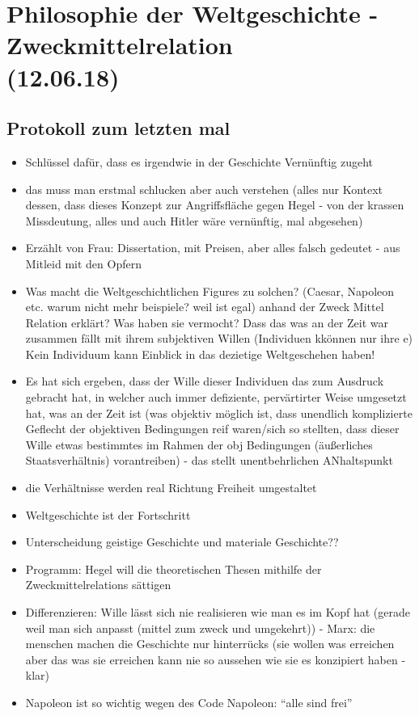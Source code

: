 \documentclass[emulatestandardclasses]{scrartcl}
\begin{document}
\section{Philosophie der Weltgeschichte - Zweckmittelrelation\\(12.06.18)}

\subsection{Protokoll zum letzten mal}

\begin{itemize}
  \item Schlüssel dafür, dass es irgendwie in der Geschichte Vernünftig zugeht
  \item das muss man erstmal schlucken aber auch verstehen (alles nur Kontext dessen, dass dieses Konzept zur Angriffsfläche gegen Hegel - von der krassen Missdeutung, alles und auch Hitler wäre vernünftig, mal abgesehen)
  \item Erzählt von Frau: Dissertation, mit Preisen, aber alles falsch gedeutet - aus Mitleid mit den Opfern
  \item Was macht die Weltgeschichtlichen Figures zu solchen? (Caesar, Napoleon etc. warum nicht mehr beispiele? weil ist egal) anhand der Zweck Mittel Relation erklärt? Was haben sie vermocht? Dass das was an der Zeit war zusammen fällt mit ihrem subjektiven Willen (Individuen kkönnen nur ihre e) Kein Individuum kann Einblick in das dezietige Weltgeschehen haben!
  \item Es hat sich ergeben, dass der Wille dieser Individuen das zum Ausdruck gebracht hat, in welcher auch immer defiziente, pervärtirter Weise umgesetzt hat, was an der Zeit ist (was objektiv möglich ist, dass unendlich komplizierte Geflecht der objektiven Bedingungen reif waren/sich so stellten, dass dieser Wille etwas bestimmtes im Rahmen der obj Bedingungen (äußerliches Staatsverhältnis) vorantreiben) - das stellt unentbehrlichen ANhaltspunkt
  \item die Verhältnisse werden real Richtung Freiheit umgestaltet 
  \item Weltgeschichte ist der Fortschritt
  \item Unterscheidung geistige Geschichte und materiale Geschichte??
  \item Programm: Hegel will die theoretischen Thesen mithilfe der Zweckmittelrelations sättigen
  \item Differenzieren: Wille lässt sich nie realisieren wie man es im Kopf hat (gerade weil man sich anpasst (mittel zum zweck und umgekehrt)) - Marx: die menschen machen die Geschichte nur hinterrücks (sie wollen was erreichen aber das was sie erreichen kann nie so aussehen wie sie es konzipiert haben - klar)
  \item Napoleon ist so wichtig wegen des Code Napoleon: "`alle sind frei"'
\end{itemize}
\end{document}
